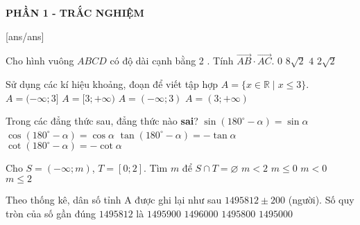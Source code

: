 
\begin{center}
	\textbf{PHẦN 1 - TRẮC NGHIỆM}
\end{center}
[ans/ans]
\begin{ex}%
	Cho hình vuông $ABCD$ có độ dài cạnh bằng 2 . Tính $\overrightarrow{AB}\cdot \overrightarrow{AC}$.
	\choice
	{$ 0  $}
	{$8 \sqrt{2}$}
	{\True $ 4  $}
	{$2 \sqrt{2}$}	
\end{ex}

\begin{ex}%
	Sử dụng các kí hiệu khoảng, đoạn để viết tập hợp $A=\{x \in \mathbb{R}\mid x \leq 3\}$.
	\choice
	{\True $A=(-\infty ; 3]$}
	{ $A=[3 ;+\infty)$}
	{$A=(-\infty ; 3)$}
	{$A=(3 ;+\infty)$}
	\loigiai{
	Ta có $A=(-\infty ; 3]$.
	}
\end{ex}

\begin{ex}%
	Trong các đẳng thức sau, đẳng thức nào \textbf{sai}?
	\choice
	{$\sin \left(180^{\circ}-\alpha\right)=\sin \alpha$}
	{\True $\cos \left(180^{\circ}-\alpha\right)=\cos \alpha$}
	{$\tan \left(180^{\circ}-\alpha\right)=-\tan \alpha$}
	{$\cot \left(180^{\circ}-\alpha\right)=-\cot \alpha$}
\end{ex}

\begin{ex}%
	Cho $S=(-\infty ; m)$, $T=[0 ; 2]$. Tìm $m$ để $S \cap T=\varnothing$
	\choice
	{$m<2$}
	{\True $m \leq 0$}
	{$m<0$}
	{$m \leq 2$}
\end{ex}

\begin{ex}%
	Theo thống kê, dân số tỉnh A được ghi lại như sau $ 1495812\pm 200 $ (người). Số quy tròn của số gần đúng $ 1495812 $ là
	\choice
	{$ 1495900  $}
	{\True $ 1496000 $ }
	{$ 1495800 $ }
	{$ 1495000 $ }
\end{ex}

